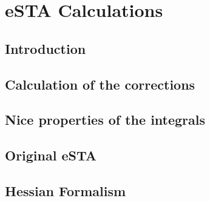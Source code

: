 \section{eSTA Calculations}

\subsection{Introduction} %


\subsection{Calculation of the corrections} %


\subsection{Nice properties of the integrals} %


\subsection{Original eSTA} %


\subsection{Hessian Formalism} %


